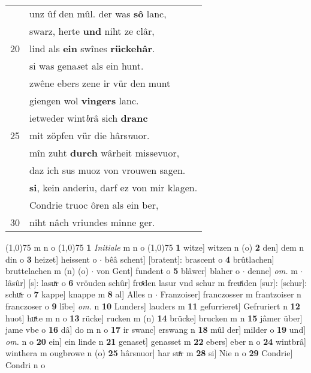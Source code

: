 \documentclass[8pt,a4paper,notitlepage]{article}
\begin{document}
\begin{table}[ht]
\begin{minipage}[t]{0.5\linewidth}
\begin{tabular}{rl}
 & unz ûf den mûl. der was \textbf{sô} lanc,\\ 
 & swarz, herte \textbf{und} niht ze clâr,\\ 
20 & lind als \textbf{ein} swînes \textbf{rückehâr}.\\ 
 & si was gena\textit{s}et als ein hunt.\\ 
 & zwêne ebers zene ir vür den munt\\ 
 & giengen wol \textbf{vingers} lanc.\\ 
 & ietweder wint\textit{b}râ sich \textbf{dranc}\\ 
25 & mit zöpfen vür die hârs\textit{n}uor.\\ 
 & mîn zuht \textbf{durch} wârheit missevuor,\\ 
 & daz ich sus muoz von vrouwen sagen.\\ 
 & \textbf{si}, kein anderiu, darf ez von mir klagen.\\ 
 & Condrie truoc ôren als ein ber,\\ 
30 & niht nâch vriundes minne ger.\\ 
\end{tabular}
\scriptsize
\line(1,0){75} \newline
m n o \newline
\line(1,0){75} \newline
\textbf{1} \textit{Initiale} m n o  \newline
\line(1,0){75} \newline
\textbf{1} witze] witzen n (o) \textbf{2} den] dem n din o \textbf{3} heizet] heissent o  $\cdot$ bêâ schent] [bratent]: brascent o \textbf{4} brûtlachen] bruttelachen m (n) (o)  $\cdot$ von Gent] fundent o \textbf{5} blâwer] blaher o  $\cdot$ denne] \textit{om.} m  $\cdot$ lâsûr] [s]: lasuͯr o \textbf{6} vröuden schûr] froͯden lasur vnd schur m freuͯiden [sur]: [schur]: schuͯr o \textbf{7} kappe] knappe m \textbf{8} al] Alles n  $\cdot$ Franzoiser] franczosser m frantzoiser n franczoser o \textbf{9} lîbe] \textit{om.} n \textbf{10} Lunders] lauders m \textbf{11} gefurrieret] Gefruriert n \textbf{12} huot] huͯte m n o \textbf{13} rücke] rucken m (n) \textbf{14} brücke] brucken m n \textbf{15} jâmer über] jame vbe o \textbf{16} dâ] do m n o \textbf{17} ir swanc] erswang n \textbf{18} mûl der] milder o \textbf{19} und] \textit{om.} n o \textbf{20} ein] ein linde n \textbf{21} genaset] genasset m \textbf{22} ebers] eber n o \textbf{24} wintbrâ] winthera m ougbrowe n (o) \textbf{25} hârsnuor] har suͯr m \textbf{28} si] Nie n o \textbf{29} Condrie] Condri n o \newline
\end{minipage}
\end{table}
\end{document}
